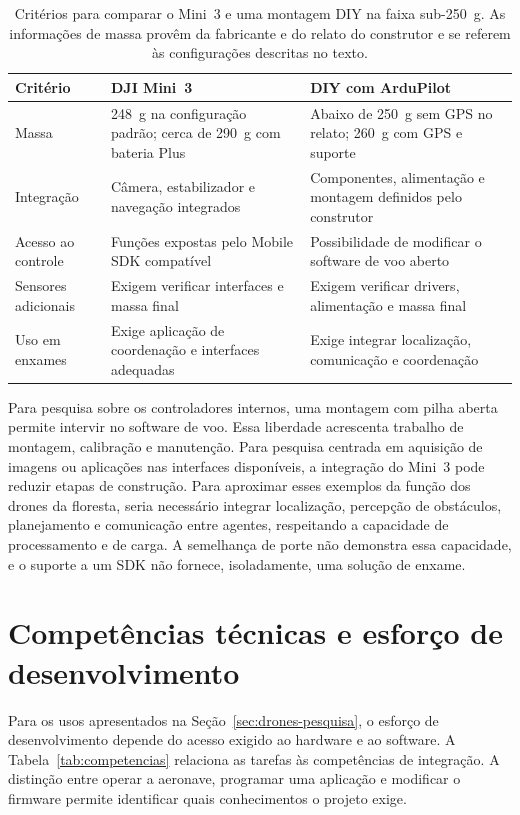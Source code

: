 \documentclass[11pt,a4paper,oneside]{book}
\numberwithin{equation}{chapter}
\begin{document}
\begin{table}[htbp]
\centering\small
\caption{Critérios para comparar o Mini~3 e uma montagem DIY na faixa sub-250~g. As informações de massa provêm da fabricante e do relato do construtor e se referem às configurações descritas no texto.}
\label{tab:sub250}
\begin{tabularx}{\textwidth}{@{}>{\raggedright\arraybackslash}p{2.8cm}YY@{}}
\toprule
Critério & DJI Mini~3 & DIY com ArduPilot \\
\midrule
Massa & 248~g na configuração padrão; cerca de 290~g com bateria Plus & Abaixo de 250~g sem GPS no relato; 260~g com GPS e suporte \\
Integração & Câmera, estabilizador e navegação integrados & Componentes, alimentação e montagem definidos pelo construtor \\
Acesso ao controle & Funções expostas pelo Mobile SDK compatível & Possibilidade de modificar o software de voo aberto \\
Sensores adicionais & Exigem verificar interfaces e massa final & Exigem verificar drivers, alimentação e massa final \\
Uso em enxames & Exige aplicação de coordenação e interfaces adequadas & Exige integrar localização, comunicação e coordenação \\
\bottomrule
\end{tabularx}
\end{table}

Para pesquisa sobre os controladores internos, uma montagem com pilha aberta permite intervir no software de voo. Essa liberdade acrescenta trabalho de montagem, calibração e manutenção. Para pesquisa centrada em aquisição de imagens ou aplicações nas interfaces disponíveis, a integração do Mini~3 pode reduzir etapas de construção. Para aproximar esses exemplos da função dos drones da floresta, seria necessário integrar localização, percepção de obstáculos, planejamento e comunicação entre agentes, respeitando a capacidade de processamento e de carga. A semelhança de porte não demonstra essa capacidade, e o suporte a um SDK não fornece, isoladamente, uma solução de enxame.
\FloatBarrier

\section{Competências técnicas e esforço de desenvolvimento}\label{sec:competencias}
Para os usos apresentados na Seção~\ref{sec:drones-pesquisa}, o esforço de desenvolvimento depende do acesso exigido ao hardware e ao software. A Tabela~\ref{tab:competencias} relaciona as tarefas às competências de integração. A distinção entre operar a aeronave, programar uma aplicação e modificar o firmware permite identificar quais conhecimentos o projeto exige.
\end{document}
